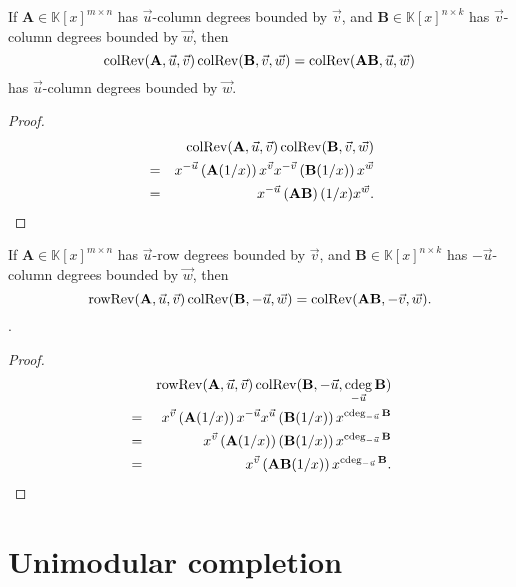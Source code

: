 \begin{lem}
\label{lem:reverseMatrixProduct}If $\mathbf{A}\in\mathbb{K}\left[x\right]^{m\times n}$
has $\vec{u}$-column degrees bounded by $\vec{v}$, and $\mathbf{B}\in\mathbb{K}\left[x\right]^{n\times k}$
has $\vec{v}$-column degrees bounded by $\vec{w}$, then 
\[
\operatorname{colRev}(\mathbf{A},\vec{u},\vec{v})\operatorname{colRev}(\mathbf{B},\vec{v},\vec{w})=\operatorname{colRev}(\mathbf{A}\mathbf{B},\vec{u},\vec{w})
\]
 has $\vec{u}$-column degrees bounded by $\vec{w}$. \end{lem}
\begin{proof}
\ 
\begin{eqnarray*}
 &  & \operatorname{colRev}(\mathbf{A},\vec{u},\vec{v})\operatorname{colRev}(\mathbf{B},\vec{v},\vec{w})\\
 & = & x^{-\vec{u}}\left(\mathbf{A}(1/x)\right)x^{\vec{v}}x^{-\vec{v}}\left(\mathbf{B}(1/x)\right)x^{\vec{w}}\\
 & = & x^{-\vec{u}}\left(\mathbf{A}\mathbf{B}\right)(1/x)x^{\vec{w}}.
\end{eqnarray*}
\end{proof}
\begin{lem}
\label{lem:reverseMatrixProduct2}If $\mathbf{A}\in\mathbb{K}\left[x\right]^{m\times n}$
has $\vec{u}$-row degrees bounded by $\vec{v}$, and $\mathbf{B}\in\mathbb{K}\left[x\right]^{n\times k}$
has $-\vec{u}$-column degrees bounded by $\vec{w}$, then 
\[
\operatorname{rowRev}(\mathbf{A},\vec{u},\vec{v})\operatorname{colRev}(\mathbf{B},-\vec{u},\vec{w})=\operatorname{colRev}(\mathbf{A}\mathbf{B},-\vec{v},\vec{w}).
\]
.\end{lem}
\begin{proof}
\begin{eqnarray*}
 &  & \rowRev(\mathbf{A},\vec{u},\vec{v})\colRev(\mathbf{B},-\vec{u},\cdeg_{-\vec{u}}\mathbf{B})\\
 & = & x^{\vec{v}}\left(\mathbf{A}(1/x)\right)x^{-\vec{u}}x^{\vec{u}}\left(\mathbf{B}(1/x)\right)x^{\cdeg_{-\vec{u}}\mathbf{B}}\\
 & = & x^{\vec{v}}\left(\mathbf{A}(1/x)\right)\left(\mathbf{B}(1/x)\right)x^{\cdeg_{-\vec{u}}\mathbf{B}}\\
 & = & x^{\vec{v}}\left(\mathbf{A}\mathbf{B}(1/x)\right)x^{\cdeg_{-\vec{u}}\mathbf{B}}.
\end{eqnarray*}

\end{proof}

\section{Unimodular completion}

